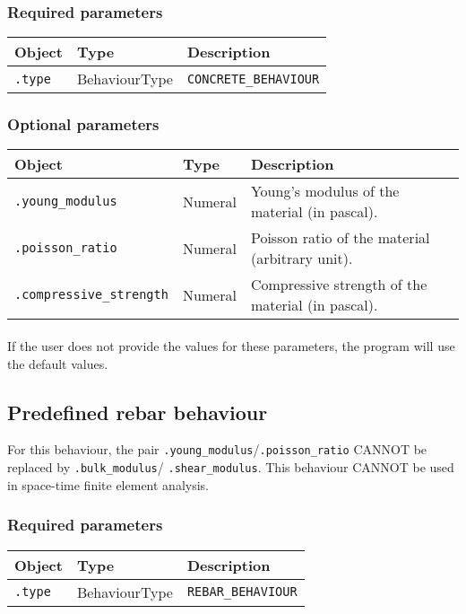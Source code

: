 \documentclass[10pt]{article}
\begin{document}
\subsubsection*{Required parameters}

\begin{tabularx}{\textwidth}{llX}
\hline 
Object & Type & Description \\ 
\hline 
\verb+.type+ & BehaviourType & \verb+CONCRETE_BEHAVIOUR+ \\ 
\hline 
\end{tabularx}

\subsubsection*{Optional parameters}

\begin{tabularx}{\textwidth}{llX}
\hline 
Object & Type & Description \\ 
\hline 
\verb+.young_modulus+ & Numeral & Young's modulus of the material (in pascal). \\ 
\verb+.poisson_ratio+ & Numeral & Poisson ratio of the material (arbitrary unit). \\ 
\verb+.compressive_strength+ & Numeral & Compressive strength of the material (in pascal). \\ 
\hline 
\end{tabularx}

\paragraph{} If the user does not provide the values for these parameters, the program will use the default values.

\subsection{Predefined rebar behaviour}

For this behaviour, the pair \verb+.young_modulus+/\verb+.poisson_ratio+ CANNOT be replaced by \verb+.bulk_modulus+/ \verb+.shear_modulus+. This behaviour CANNOT be used in space-time finite element analysis.

\subsubsection*{Required parameters}

\begin{tabularx}{\textwidth}{llX}
\hline 
Object & Type & Description \\ 
\hline 
\verb+.type+ & BehaviourType & \verb+REBAR_BEHAVIOUR+ \\ 
\hline 
\end{tabularx}
\end{document}
